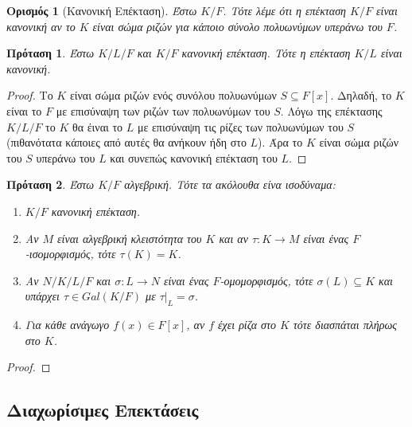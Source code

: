 \documentclass[oneside,a4paper]{article}
\newtheorem*{defn}{Ορισμός}
\newtheorem{prop}{Πρόταση}
\begin{document}
\begin{defn}[Κανονική Επέκταση] Έστω $K/F$. Τότε λέμε ότι η επέκταση $K/F$ είναι κανονική αν το $K$ είναι σώμα ριζών για κάποιο σύνολο πολυωνύμων υπεράνω του $F$.
\end{defn}

\begin{prop}
	\label{exa3.25}
	Έστω $K/L/F$ και $K/F$ κανονική επέκταση. Τότε η επέκταση $K/L$ είναι κανονική.
\end{prop}
\begin{proof}
	Το $K$ είναι σώμα ριζών ενός συνόλου πολυωνύμων $S \subseteq F[x]$. Δηλαδή, το $K$ είναι το $F$ με επισύναψη των ριζών των πολυωνύμων του $S$. Λόγω της επέκτασης $K/L/F$ το $K$ θα έιναι το $L$ με επισύναψη τις ρίζες των πολυωνύμων του $S$ (πιθανότατα κάποιες από αυτές θα ανήκουν ήδη στο $L$). Άρα το $K$ είναι σώμα ριζών του $S$ υπεράνω του $L$ και συνεπώς κανονική επέκταση του $L$.
\end{proof}

\begin{prop}%
	\label{3.28}
	Έστω $K/F$ αλγεβρική. Τότε τα ακόλουθα είνα ισοδύναμα:
	\begin{enumerate}
		\item $K/F$ κανονική επέκταση.
		\item Αν $M$ είναι αλγεβρική κλειστότητα του $K$ και αν $\tau : K \rightarrow M$ είναι ένας $F$-ισομορφισμός, τότε $\tau(K) = K$. %
		\item Αν $N/K/L/F$ και $\sigma : L \rightarrow N$ είναι ένας $F$-ομομορφισμός, τότε $\sigma(L) \subseteq K$ και υπάρχει $\tau \in Gal(K/F)$ με $\tau|_L = \sigma$.
		\item Για κάθε ανάγωγο $f(x) \in F[x]$, αν $f$ έχει ρίζα στο $K$ τότε διασπάται πλήρως στο $K$.
	\end{enumerate}
\end{prop}

\begin{proof}
\end{proof}

\subsection{Διαχωρίσιμες Επεκτάσεις}
\vspace{1cm}
\end{document}
